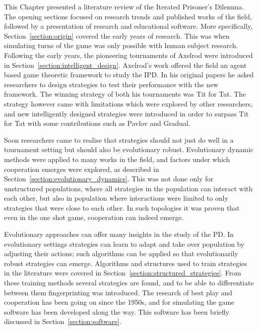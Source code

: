 This Chapter presented a literature review of the Iterated Prisoner's
Dilemma. The opening sections focused on research trends and published works of
the field, followed by a presentation of research and educational software.
More specifically, Section~\ref{section:origin}
covered the early years of research. This was when simulating turns of the game
was only possible with human subject research.
Following the early years, the pioneering tournaments of Axelrod were introduced in
Section~\ref{section:intelligent_design}. Axelrod's work offered the field an
agent based game theoretic framework to study the IPD.
In his original papers he asked researchers to design strategies to test their
performance with the new framework. The winning strategy of both his tournaments
was Tit for Tat. The strategy however came with limitations which were explored
by other researchers, and new intelligently designed strategies were introduced in
order to surpass Tit for Tat with some contributions such as Pavlov and Gradual.

Soon researchers came to realise that strategies should not just do well in a tournament setting
but should also be evolutionary robust. Evolutionary dynamic methods were
applied to many works in the field, and factors under which cooperation
emerges were explored, as described in Section~\ref{section:evolutionary_dynamics}.
This was not done only for unstructured populations, where all strategies
in the population can interact with each other, but also in population where
interactions were limited to only strategies that were close to each other.
In such topologies it was proven that even in the one shot game, cooperation can
indeed emerge.

Evolutionary approaches can offer many insights in the study of the PD. In
evolutionary settings strategies can learn to adapt and take over population by
adjusting their actions; such algorithms can be applied so that evolutionarily
robust strategies can emerge. Algorithms and structures used to train strategies
in the literature were covered in Section~\ref{section:structured_strategies}.
From these training methods several strategies are found,
and to be able to differentiate between them fingerprinting was
introduced. The research of best play and cooperation has been going on since
the 1950s, and for simulating the game software has been developed along the
way. This software has been briefly discussed
in Section~\ref{section:software}.

